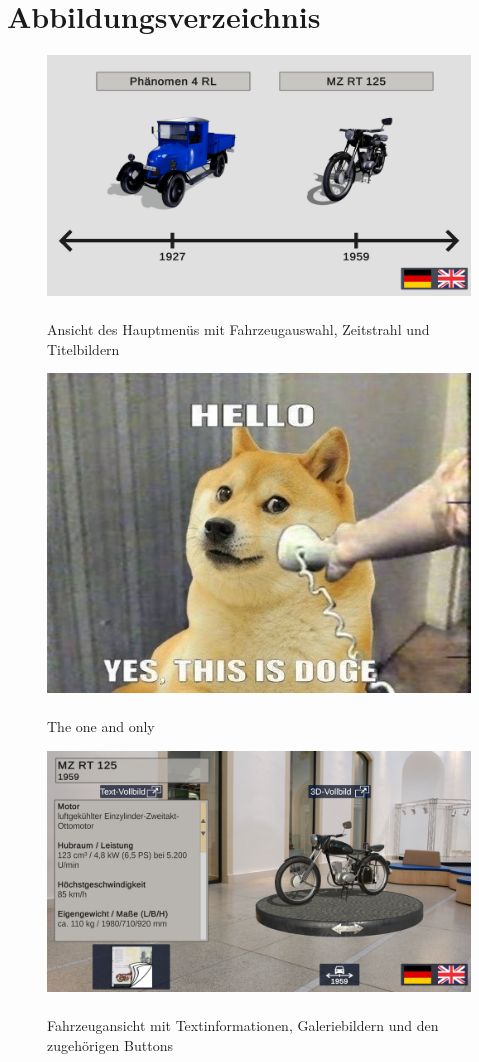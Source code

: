 \chapter{Abbildungsverzeichnis}
%
\begin{figure}[htp]
	\centering
	\includegraphics[width=0.9\linewidth]{images/main_menu}
	\caption[main menu]{\\Ansicht des Hauptmenüs mit Fahrzeugauswahl, Zeitstrahl und Titelbildern}
	\label{fig:mainmenu}
\end{figure}
%
\begin{figure}[htp]
	\centering
	\includegraphics[width=0.9\linewidth]{images/hellodoge}
	\caption[hello, this is doge]{\\The one and only}
	\label{fig:doge}
\end{figure}
%
\begin{figure}[htp]
	\centering
	\includegraphics[width=0.9\linewidth]{images/vehicle_view}
	\caption[vehicle_view]{\\Fahrzeugansicht mit Textinformationen, Galeriebildern und den zugehörigen Buttons}
	\label{fig:vehicle_view}
\end{figure}
